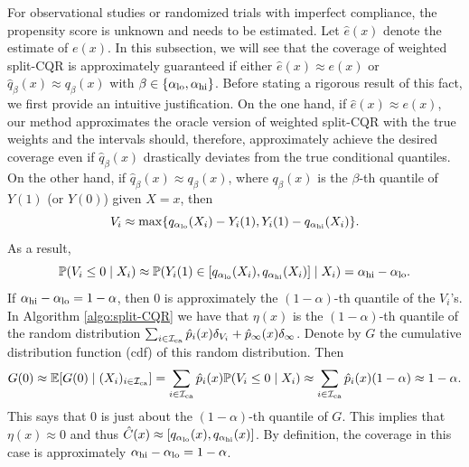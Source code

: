 For observational studies or randomized trials with imperfect
compliance, the propensity score is unknown and needs to be
estimated. Let $\hat{e}(x)$ denote the estimate of $e(x)$. In this
subsection, we will see that the coverage of weighted split-CQR is
approximately guaranteed if either $\hat{e}(x)\approx e(x)$ or
$\hat{q}_{\beta}(x)\approx q_{\beta}(x)$ with
$\beta \in \{\alpha_{\mathrm{lo}}, \alpha_{\mathrm{hi}}\}$.  Before stating a rigorous
result of this fact, we first provide an intuitive justification. On
the one hand, if $\hat{e}(x)\approx e(x)$, our method approximates the
oracle version of weighted split-CQR with the true weights and the
intervals should, therefore, approximately achieve the desired
coverage even if $\hat{q}_{\beta}(x)$ drastically deviates from the
true conditional quantiles. On the other hand, if
$\hat{q}_{\beta}(x) \approx q_{\beta}(x)$, where $q_{\beta}(x)$ is the
$\beta$-th quantile of $Y(1)$ (or $Y(0)$) given $X = x$, then
\[
V_{i}\approx \max\{q_{\alpha_{\mathrm{lo}}}(X_{i}) - Y_{i}(1), Y_{i}(1) -
q_{\alpha_{\mathrm{hi}}}(X_{i})\}.
\]
As a result,
\[
\mathbb{P}(V_{i}\le 0\mid X_{i}) \approx \mathbb{P}(Y_{i}(1) \in
[q_{\alpha_{\mathrm{lo}}}(X_{i}), q_{\alpha_{\mathrm{hi}}}(X_{i})]\mid X_{i}) =
\alpha_{\mathrm{hi}} - \alpha_{\mathrm{lo}}.
\]
If $\alpha_{\mathrm{hi}} - \alpha_{\mathrm{lo}} = 1 - \alpha$, then $0$ is
approximately the $(1 - \alpha)$-th quantile of the $V_{i}$'s. In
Algorithm \ref{algo:split-CQR} we have that $\eta(x)$ is the
$(1 - \alpha)$-th quantile of the random distribution
$\sum_{i\in \mathcal{I}_{\mathrm{ca}}}\hat{p}_{i}(x)\delta_{V_{i}} +
\hat{p}_{\infty}(x)\delta_{\infty}$.
Denote by $G$ the cumulative distribution function (cdf) of this
random distribution. Then
\[G(0) \approx \mathbb{E} [G(0) \mid (X_i)_{i\in \mathcal{I}_{\mathrm{ca}}}] =
\sum_{i\in \mathcal{I}_{\mathrm{ca}}}\hat{p}_{i}(x)\mathbb{P}(V_{i}\le 0 \mid X_{i}) \approx
\sum_{i\in \mathcal{I}_{\mathrm{ca}}}\hat{p}_{i}(x)(1 - \alpha) \approx 1 - \alpha.\]
This says that $0$ is just about the $(1 - \alpha)$-th quantile of
$G$. This implies that $\eta(x) \approx 0$ and thus
$\hat{C}(x) \approx [q_{\alpha_{\mathrm{lo}}}(x), q_{\alpha_{\mathrm{hi}}}(x)]$. By
definition, the coverage in this case is approximately
$\alpha_{\mathrm{hi}} - \alpha_{\mathrm{lo}} = 1 - \alpha$.

